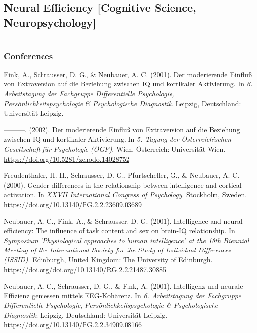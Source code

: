 \documentclass[
]{article}
\begin{document}
\hypertarget{neural-efficiency-cognitive-science-neuropsychology}{%
\subsection{Neural Efficiency {[}Cognitive Science,
Neuropsychology{]}}\label{neural-efficiency-cognitive-science-neuropsychology}}

\begin{center}\rule{0.5\linewidth}{0.5pt}\end{center}

\hypertarget{conferences-1}{%
\subsubsection{Conferences}\label{conferences-1}}

Fink, A., Schrausser, D. G., \& Neubauer, A. C. (2001). Der moderierende
Einfluß von Extraversion auf die Beziehung zwischen IQ und kortikaler
Aktivierung. In \emph{6. Arbeitstagung der Fachgruppe Differentielle
Psychologie, Persönlichkeitspsychologie \& Psychologische Diagnostik}.
Leipzig, Deutschland: Universität Leipzig.

---------. (2002). Der moderierende Einfluß von Extraversion auf die
Beziehung zwischen IQ und kortikaler Aktivierung. In \emph{5. Tagung der
Österreichischen Gesellschaft für Psychologie (ÖGP)}. Wien, Österreich:
Universität Wien. \url{https://doi.org/10.5281/zenodo.14028752}

Freudenthaler, H. H., Schrausser, D. G., Pfurtscheller, G., \& Neubauer,
A. C. (2000). Gender differences in the relationship between
intelligence and cortical activation. In \emph{XXVII International
Congress of Psychology}. Stockholm, Sweden.
\url{https://doi.org/10.13140/RG.2.2.23609.03689}

Neubauer, A. C., Fink, A., \& Schrausser, D. G. (2001). Intelligence and
neural efficiency: The influence of task content and sex on brain-IQ
relationship. In \emph{Symposium 'Physiological approaches to human
intelligence' at the 10th Biennial Meeting of the International Society
for the Study of Individual Differences (ISSID)}. Edinburgh, United
Kingdom: The University of Edinburgh.
\url{https://doi.org/doi.org/10.13140/RG.2.2.21487.30885}

Neubauer, A. C., Schrausser, D. G., \& Fink, A. (2001). Intelligenz und
neurale Effizienz gemessen mittels EEG-Kohärenz. In \emph{6.
Arbeitstagung der Fachgruppe Differentielle Psychologie,
Persönlichkeitspsychologie \& Psychologische Diagnostik}. Leipzig,
Deutschland: Universität Leipzig.
\url{https://doi.org/10.13140/RG.2.2.34909.08166}
\end{document}
